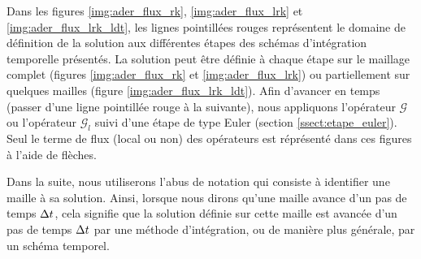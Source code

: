 Dans les figures \ref{img:ader_flux_rk},
\ref{img:ader_flux_lrk} et \ref{img:ader_flux_lrk_ldt},
les lignes pointillées rouges représentent le
domaine de définition de la solution aux différentes étapes
des schémas d'intégration temporelle présentés.
La solution peut être définie à chaque étape sur le maillage complet
(figures \ref{img:ader_flux_rk} et \ref{img:ader_flux_lrk})
ou partiellement sur quelques mailles (figure \ref{img:ader_flux_lrk_ldt}).
Afin d'avancer en temps (passer d'une ligne pointillée rouge à la suivante),
nous appliquons l'opérateur $\mathcal{G}$ ou l'opérateur $\mathcal{G}_l$
suivi d'une étape de type Euler (section \ref{ssect:etape_euler}).
Seul le terme de flux (local ou non) des opérateurs est réprésenté
dans ces figures à l'aide de flèches.


\begin{remark}
	Dans la suite, nous utiliserons l'abus de notation qui consiste
	à identifier une maille à sa solution. Ainsi, lorsque nous dirons
	qu'une maille avance d'un pas de temps $\Delta t$, cela signifie que
	la solution définie sur cette maille est avancée d'un pas de
	temps $\Delta t$ par une méthode d'intégration, ou de manière
	plus générale, par un schéma temporel.
\end{remark}

